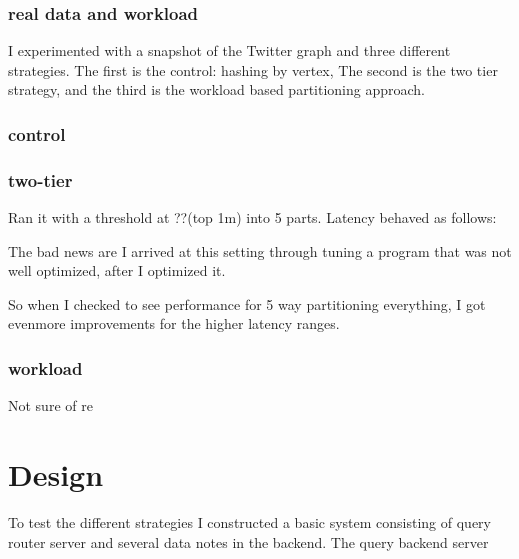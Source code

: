 \documentclass[11pt]{article}
\begin{document}
\subsubsection{real data and workload}
I experimented with a snapshot of the Twitter graph and three different strategies. The first is the control:  hashing by vertex, 
The second is the two tier strategy, and the third is the workload based partitioning approach.

\subsubsection{control}


\subsubsection{two-tier}
Ran it with a threshold at ??(top 1m) into 5 parts.  Latency behaved as follows:


The bad news are I arrived at this setting through tuning a program that was not well optimized, after I optimized it.



So when I checked to see performance for 5 way partitioning everything, I got evenmore improvements for the higher latency ranges.

\subsubsection{workload}
Not sure of re



\section{Design}

To test the different strategies I constructed a basic system consisting of query router server and  several data notes in the backend.  The query backend server 

\end{document}
